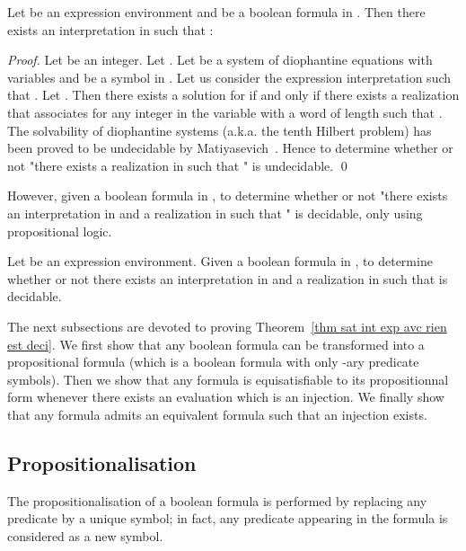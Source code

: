 \documentclass[a4paper]{llncs}
\begin{document}
   \begin{theorem}
     Let  be an expression environment and  be a boolean formula in . Then there exists an interpretation  in  such that :
     
   \end{theorem}   
   \begin{proof}
      Let  be an integer. Let . Let  be a system of diophantine equations with  variables and  be a symbol in .      
     Let us consider the expression interpretation  such that  .
     Let . 
     Then there exists a solution  for  if and only if there exists a realization  that associates for any integer  in  the variable  with a word  of length  such that .
     The solvability of diophantine systems (a.k.a. the tenth Hilbert problem) has been proved to be undecidable by Matiyasevich~\cite{My93}. 
     Hence to determine whether or not "there exists a realization  in  such that " is undecidable.
     \qed
   \end{proof}
  
  However, given a boolean formula  in , to determine whether or not "there exists an interpretation  in  and a realization  in  such that " is decidable, only using propositional logic.
  
  \begin{theorem}\label{thm sat int exp avc rien est deci}
     Let  be an expression environment. Given a boolean formula  in , to determine whether or not there exists an interpretation  in  and a realization  in  such that  is decidable.
   \end{theorem} 
   
   The next subsections are devoted to proving Theorem~\ref{thm sat int exp avc rien est deci}. We first show that any boolean formula can be transformed into a propositional formula (which is a boolean formula with only -ary predicate symbols). Then we show that any formula is equisatisfiable to its propositionnal form whenever there exists an evaluation which is an injection. We finally show that any formula admits an equivalent formula such that an injection exists.
   
  \subsection{Propositionalisation}
  
  The propositionalisation of a boolean formula is performed by replacing any predicate by a unique symbol; in fact, any predicate appearing in the formula is considered as a new symbol.
  
\end{document}
